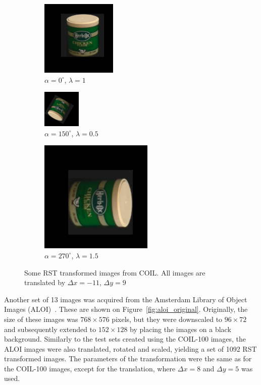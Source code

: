 \begin{figure}[tbp]
	\begin{subfigure}{0.29\textwidth}
        \centering
    \includegraphics[width=102pt]{figures/coil_rst/26x-11y9r0s1_0.png}
    \caption{$\alpha=0^{\circ}$, $\lambda=1$}
	\end{subfigure}
	\begin{subfigure}{0.28\textwidth}
        \centering
    \includegraphics[width=51pt]{figures/coil_rst/26x-11y9r150s0_5.png}
    \caption{$\alpha=150^{\circ}$, $\lambda=0.5$}
	\end{subfigure}
	\begin{subfigure}{0.40\textwidth}
        \centering
    \includegraphics[width=153pt]{figures/coil_rst/26x-11y9r270s1_75.png}
    \caption{$\alpha=270^{\circ}$, $\lambda=1.5$}
	\end{subfigure}
	\caption{Some RST transformed images from COIL. All images are translated by $\Delta x = -11$, $\Delta y = 9$}
	\label{fig:coil_rst}
\end{figure}

Another set of 13 images was acquired from the Amsterdam Library of Object Images (ALOI)~\cite{aloi}. These are shown on Figure~\ref{fig:aloi_original}. Originally, the size of these images was $768 \times 576$ pixels, but they were downscaled to $96 \times 72$ and subsequently extended to $152 \times 128$ by placing the images on a black background. Similarly to the test sets created using the COIL-100 images, the ALOI images were also translated, rotated and scaled, yielding a set of 1092 RST transformed images. The parameters of the transformation were the same as for the COIL-100 images, except for the translation, where $\Delta x = 8$ and $\Delta y = 5$ was used.

